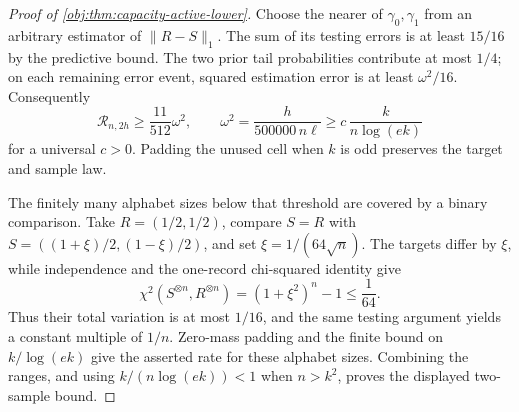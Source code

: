 \documentclass[11pt]{article}
\begin{document}
\begin{proof}[Proof of \cref{obj:thm:capacity-active-lower}]
Choose the nearer of \(\gamma_0,\gamma_1\) from an arbitrary estimator of \(\|R-S\|_1\). The sum of its testing errors is at least \(15/16\) by the predictive bound. The two prior tail probabilities contribute at most \(1/4\); on each remaining error event, squared estimation error is at least \(\omega^2/16\). Consequently
\[
\mathcal R_{n,2h}\ge\frac{11}{512}\omega^2,
\qquad
\omega^2=\frac{h}{500000\,n\ell}
\ge c\,\frac{k}{n\log(ek)}
\]
for a universal \(c>0\). Padding the unused cell when \(k\) is odd preserves the target and sample law. %

The finitely many alphabet sizes below that threshold are covered by a binary comparison. Take \(R=(1/2,1/2)\), compare \(S=R\) with
\(S=((1+\xi)/2,(1-\xi)/2)\), and set \(\xi=1/(64\sqrt n)\). The targets differ by \(\xi\), while independence and the one-record chi-squared identity give
\[
\chi^2(S^{\otimes n},R^{\otimes n})
=(1+\xi^2)^n-1\le\frac1{64}.
\] %
Thus their total variation is at most \(1/16\), and the same testing argument yields a constant multiple of \(1/n\). Zero-mass padding and the finite bound on \(k/\log(ek)\) give the asserted rate for these alphabet sizes. Combining the ranges, and using \(k/(n\log(ek))<1\) when \(n>k^2\), proves the displayed two-sample bound. %


\end{proof}
\end{document}
